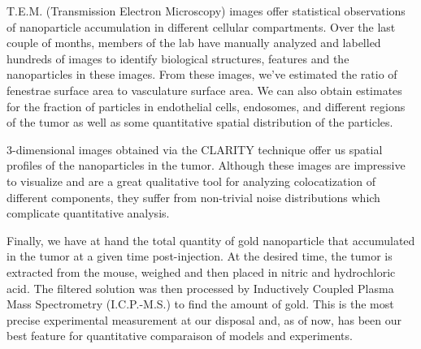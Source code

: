 T.E.M. (Transmission Electron Microscopy) images offer statistical observations of nanoparticle accumulation in different cellular compartments.
Over the last couple of months, members of the lab have manually analyzed and labelled hundreds of images to identify biological structures, features and the nanoparticles in these images.
From these images, we've estimated the ratio of fenestrae surface area to vasculature surface area.
We can also obtain estimates for the fraction of particles in endothelial cells, endosomes, and different regions of the tumor as well as some quantitative spatial distribution of the particles.
 
3-dimensional images obtained via the CLARITY technique\cite{chung2013structural} offer us spatial profiles of the nanoparticles in the tumor.
Although these images are impressive to visualize and are a great qualitative tool for analyzing colocatization of different components, they suffer from non-trivial noise distributions which complicate quantitative analysis.

Finally, we have at hand the total quantity of gold nanoparticle that accumulated in the tumor at a given time post-injection. At the desired time, the tumor is extracted from the mouse, weighed and then placed in nitric and hydrochloric acid. The filtered solution was then processed by Inductively Coupled Plasma Mass Spectrometry (I.C.P.-M.S.) to find the amount of gold. This is the most precise experimental measurement at our disposal and, as of now, has been our best feature for quantitative comparaison of models and experiments.
